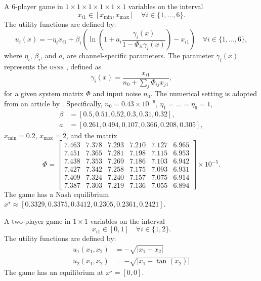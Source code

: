 \begin{game}\label{ex.nguyen23.iv}
A 6-player game in $1 \times 1 \times 1 \times 1 \times 1 \times 1$ variables
on the interval
$$x_{i1} \in [x_{\min},x_{\max}] \quad \forall i \in \{1,\dots,6\}.$$
The utility functions are defined by:
$$
u_i(x) = -\eta_ix_{i1}+\beta_i \left(\ln \left(1+a_i\frac{\gamma_i(x)}{1-\Phi_{ii}\gamma_i(x)} \right)-x_{i1}\right) \quad \forall i \in \{1,\dots,6\},
$$
where $\eta_i$, $\beta_i$, and $a_i$ are channel-specific parameters. The parameter $\gamma_i(x)$ represents the \textsc{osnr} \cite{osnr}, defined as
$$
\gamma_i(x) = \frac{x_{i1}}{n_0+\sum_j\Phi_{ij}x_{j1}},
$$
for a given system matrix $\Phi$ and input noise $n_0$. The numerical setting is adopted from an article by \textcite{nguyen.bianchi.ea:nash}. Specifically, $n_0=0.43\times10^{-6}$, $\eta_1=\dots=\eta_6=1$,
\begin{align*}
    \beta & = [0.5, 0.51, 0.52, 0.3, 0.31, 0.32],\\ a & = [0.261, 0.494, 0.107, 0.366, 0.208, 0.305],
\end{align*}
 $x_{\min} = 0.2$, $x_{\max} = 2$, and the matrix
\[
\Phi = \begin{bmatrix}
7.463 & 7.378 & 7.293 & 7.210 & 7.127 & 6.965 \\
7.451 & 7.365 & 7.281 & 7.198 & 7.115 & 6.953 \\
7.438 & 7.353 & 7.269 & 7.186 & 7.103 & 6.942 \\
7.427 & 7.342 & 7.258 & 7.175 & 7.093 & 6.931 \\
7.409 & 7.324 & 7.240 & 7.157 & 7.075 & 6.914 \\
7.387 & 7.303 & 7.219 & 7.136 & 7.055 & 6.894
\end{bmatrix}
\times 10^{-5}.
\]
The game has a Nash equilibrium $x^\star \approx [0.3329, 0.3375, 0.3412, 0.2305, 0.2361, 0.2421]$.
\end{game}

\begin{game}\label{ex.tangent.ridge}
A two-player game in $1 \times 1$ variables
on the interval
$$x_{i1} \in [0,1] \quad \forall i \in \{1,2\}.$$
The utility functions are defined by:
\[\begin{aligned}
u_1(x_1,x_2)&=-\sqrt{|x_1-x_2|} \\
u_2(x_1,x_2)&=-\sqrt{|x_1-\tan(x_2)|}
\end{aligned}\]
The game has an equilibrium at $x^\star=[0,0]$.

\end{game}
